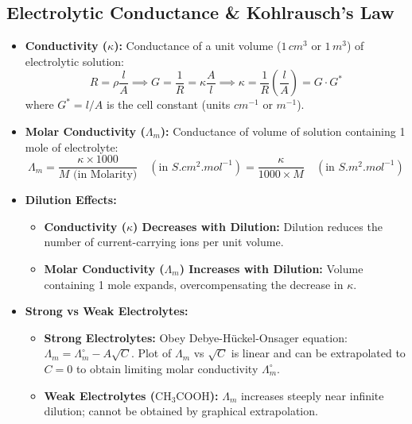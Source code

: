 \documentclass[10pt,twoside,openright]{book}
\begin{document}
\subsection{Electrolytic Conductance \& Kohlrausch's Law}
\begin{itemize}
  \item \textbf{Conductivity ($\kappa$):} Conductance of a unit volume ($1\,\si{cm^3}$ or $1\,\si{m^3}$) of electrolytic solution:
  \begin{equation}
    R = \rho \frac{l}{A} \implies G = \frac{1}{R} = \kappa \frac{A}{l} \implies \kappa = \frac{1}{R}\left(\frac{l}{A}\right) = G \cdot G^*
  \end{equation}
  where $G^* = l/A$ is the cell constant (units $\si{cm^{-1}}$ or $\si{m^{-1}}$).
  \item \textbf{Molar Conductivity ($\Lambda_m$):} Conductance of volume of solution containing 1 mole of electrolyte:
  \begin{equation}
    \Lambda_m = \frac{\kappa \times 1000}{M\text{ (in Molarity)}} \quad (\text{in }\si{S.cm^2.mol^{-1}}) = \frac{\kappa}{1000 \times M} \quad (\text{in }\si{S.m^2.mol^{-1}})
  \end{equation}
  \item \textbf{Dilution Effects:}
  \begin{itemize}
    \item \textbf{Conductivity ($\kappa$) Decreases with Dilution:} Dilution reduces the number of current-carrying ions per unit volume.
    \item \textbf{Molar Conductivity ($\Lambda_m$) Increases with Dilution:} Volume containing 1 mole expands, overcompensating the decrease in $\kappa$.
  \end{itemize}
  \item \textbf{Strong vs Weak Electrolytes:}
  \begin{itemize}
    \item \textbf{Strong Electrolytes:} Obey Debye-Hückel-Onsager equation: $\Lambda_m = \Lambda_m^\circ - A\sqrt{C}$. Plot of $\Lambda_m$ vs $\sqrt{C}$ is linear and can be extrapolated to $C = 0$ to obtain limiting molar conductivity $\Lambda_m^\circ$.
    \item \textbf{Weak Electrolytes ($\mathrm{CH_3COOH}$):} $\Lambda_m$ increases steeply near infinite dilution; cannot be obtained by graphical extrapolation.
  \end{itemize}
\end{itemize}
\end{document}
